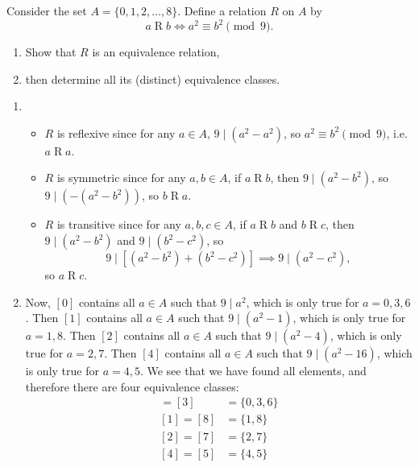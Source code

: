 \documentclass{article}
\theoremstyle{definition}
\begin{document}
\begin{question}
    Consider the set $A = \{0, 1, 2, \dots, 8 \}$. Define a relation $R$ on $A$ by
	\[
	a\mathrel{R}b \iff a^2 \equiv b^2 \pmod{9}.
	\]
	\begin{enumerate}
	\item Show that $R$ is an equivalence relation, 
	\item then determine all its (distinct) equivalence classes.
	\end{enumerate}
\end{question}
\begin{solution}
	\begin{enumerate}
	\item 
	\begin{itemize} 
		\item $ R$ is reflexive since for any $a \in A$, $9 \mid (a^2 - a^2)$, so $a^2 \equiv b^2 \pmod{9}$, i.e. $a \mathrel{R}a$.
		\item $ R$ is symmetric since for any $a,b \in A$, if $a \mathrel{R}b$, then $9 \mid (a^2 - b^2)$, so $9 \mid \left(- (a^2 - b^2)\right)$, so $b \mathrel{R}a$.
		\item $R$ is transitive since for any $a,b, c \in A$, if $a \mathrel{R}b$ and $b \mathrel{R}c$, then $9 \mid (a^2 - b^2)$ and $9 \mid (b^2 - c^2)$, so 
		\[
		9 \mid \left[(a^ 2 - b^2) + (b^2 - c^2)\right] 
		\implies 9 \mid (a^2 - c^2),
		\]
		so $a \mathrel{R}c$.
	\end{itemize}
	\item Now, $[0]$ contains all $a \in A$ such that $9 \mid a^2$, which is only true for $a = 0, 3, 6$. Then $[1]$ contains all $a \in A$ such that $9 \mid (a^2 - 1)$, which is only true for $a = 1, 8$. Then $[2]$ contains all $a \in A$ such that $9 \mid (a^2 - 4)$, which is only true for $a = 2, 7$. Then $[4]$ contains all $a \in A$ such that $9 \mid (a^2 - 16)$, which is only true for $a = 4, 5$. We see that we have found all elements, and therefore there are four equivalence classes:
		\begin{align*}
		[0] = [3] &= \{ 0, 3, 6 \} \\
		[1] = [8] &= \{ 1, 8 \} \\
		[2] = [7] &= \{ 2, 7 \} \\
		[4] = [5] &= \{ 4, 5 \}
		\end{align*}
	\end{enumerate}
\end{solution}
\end{document}
